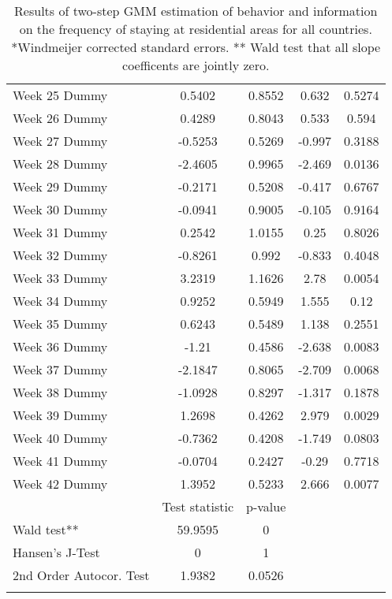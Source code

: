 \begin{longtable}{lcccc}
  Week 25 Dummy & 0.5402 & 0.8552 & 0.632 & 0.5274 \\ 
  Week 26 Dummy & 0.4289 & 0.8043 & 0.533 & 0.594 \\ 
  Week 27 Dummy & -0.5253 & 0.5269 & -0.997 & 0.3188 \\ 
  Week 28 Dummy & -2.4605 & 0.9965 & -2.469 & 0.0136 \\ 
  Week 29 Dummy & -0.2171 & 0.5208 & -0.417 & 0.6767 \\ 
  Week 30 Dummy & -0.0941 & 0.9005 & -0.105 & 0.9164 \\ 
  Week 31 Dummy & 0.2542 & 1.0155 & 0.25 & 0.8026 \\ 
  Week 32 Dummy & -0.8261 & 0.992 & -0.833 & 0.4048 \\ 
  Week 33 Dummy & 3.2319 & 1.1626 & 2.78 & 0.0054 \\ 
  Week 34 Dummy & 0.9252 & 0.5949 & 1.555 & 0.12 \\ 
  Week 35 Dummy & 0.6243 & 0.5489 & 1.138 & 0.2551 \\ 
  Week 36 Dummy & -1.21 & 0.4586 & -2.638 & 0.0083 \\ 
  Week 37 Dummy & -2.1847 & 0.8065 & -2.709 & 0.0068 \\ 
  Week 38 Dummy & -1.0928 & 0.8297 & -1.317 & 0.1878 \\ 
  Week 39 Dummy & 1.2698 & 0.4262 & 2.979 & 0.0029 \\ 
  Week 40 Dummy & -0.7362 & 0.4208 & -1.749 & 0.0803 \\ 
  Week 41 Dummy & -0.0704 & 0.2427 & -0.29 & 0.7718 \\ 
  Week 42 Dummy & 1.3952 & 0.5233 & 2.666 & 0.0077 \\ 
   & Test statistic & p-value &  &  \\ 
  Wald test** & 59.9595 & 0 &  &  \\ 
  Hansen's J-Test & 0 & 1 &  &  \\ 
  2nd Order Autocor. Test & 1.9382 & 0.0526 &  &  \\ 
   \bottomrule
\caption{Results of two-step GMM estimation of behavior and information on the frequency of staying at residential areas for all countries. *Windmeijer corrected standard errors. ** Wald test that all slope coefficents are jointly zero.} 
\label{tab_results:residential_full}
\end{longtable}
\endgroup
